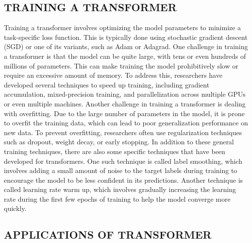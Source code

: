 \documentclass[letterpaper, 10pt, conference]{ieeeconf}
\begin{document}
        
        
        \subsection{TRAINING A TRANSFORMER}
        
        Training a transformer involves optimizing the model parameters to minimize a task-specific loss function. This is typically done
        using stochastic gradient descent (SGD) or one of its variants, such as Adam or Adagrad\cite{jiang2020}.
        One challenge in training a transformer is that the model can be quite large, with tens or even hundreds of millions of
        parameters. This can make training the model prohibitively slow or require an excessive amount of memory. To address this,
        researchers have developed several techniques to speed up training, including gradient accumulation, mixed-precision training, and
        parallelization across multiple GPUs or even multiple machines.
        Another challenge in training a transformer is dealing with overfitting. Due to the large number of parameters in the
        model, it is prone to overfit the training data, which can lead to poor generalization performance on new data. To prevent
        overfitting, researchers often use regularization techniques such as dropout, weight decay, or early stopping.
        In addition to these general training techniques, there are also some specific techniques that have been developed for
        transformers. One such technique is called label smoothing, which involves adding a small amount of noise to the target labels
        during training to encourage the model to be less confident in its predictions. Another technique is called learning rate warm up,
        which involves gradually increasing the learning rate during the first few epochs of training to help the model converge more
        quickly\cite{vaswani2017}.
        
        
        \subsection{APPLICATIONS OF TRANSFORMER}
        
\end{document}
